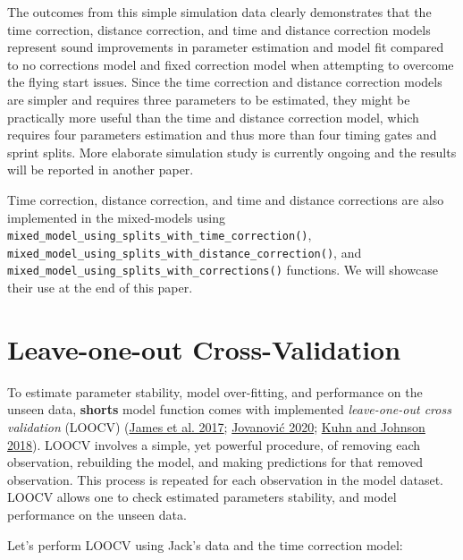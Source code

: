 \documentclass[fleqn,10pt]{wlpeerj} %
\newenvironment{Shaded}{\begin{snugshade}}{\end{snugshade}}
\newcommand{\AttributeTok}[1]{\textcolor[rgb]{0.77,0.63,0.00}{#1}}
\newcommand{\ConstantTok}[1]{\textcolor[rgb]{0.00,0.00,0.00}{#1}}
\newcommand{\FunctionTok}[1]{\textcolor[rgb]{0.00,0.00,0.00}{#1}}
\newcommand{\NormalTok}[1]{#1}
\newcommand{\OtherTok}[1]{\textcolor[rgb]{0.56,0.35,0.01}{#1}}
\newcommand{\SpecialCharTok}[1]{\textcolor[rgb]{0.00,0.00,0.00}{#1}}
\begin{document}
\normalsize

The outcomes from this simple simulation data clearly demonstrates that the time correction, distance correction, and time and distance correction models represent sound improvements in parameter estimation and model fit compared to no corrections model and fixed correction model when attempting to overcome the flying start issues. Since the time correction and distance correction models are simpler and requires three parameters to be estimated, they might be practically more useful than the time and distance correction model, which requires four parameters estimation and thus more than four timing gates and sprint splits. More elaborate simulation study is currently ongoing and the results will be reported in another paper.

Time correction, distance correction, and time and distance corrections are also implemented in the mixed-models using \texttt{mixed\_model\_using\_splits\_with\_time\_correction()}, \texttt{mixed\_model\_using\_splits\_with\_distance\_correction()}, and \texttt{mixed\_model\_using\_splits\_with\_corrections()} functions. We will showcase their use at the end of this paper.

\hypertarget{leave-one-out-cross-validation}{%
\section{Leave-one-out Cross-Validation}\label{leave-one-out-cross-validation}}

To estimate parameter stability, model over-fitting, and performance on the unseen data, \textbf{shorts} model function comes with implemented \emph{leave-one-out cross validation} (LOOCV) (\protect\hyperlink{ref-jamesIntroductionStatisticalLearning2017}{James et al. 2017}; \protect\hyperlink{ref-jovanovicBmbstatsBootstrapMagnitudebased2020}{Jovanović 2020}; \protect\hyperlink{ref-kuhnAppliedPredictiveModeling2018}{Kuhn and Johnson 2018}). LOOCV involves a simple, yet powerful procedure, of removing each observation, rebuilding the model, and making predictions for that removed observation. This process is repeated for each observation in the model dataset. LOOCV allows one to check estimated parameters stability, and model performance on the unseen data.

Let's perform LOOCV using Jack's data and the time correction model:

\small

\begin{Shaded}
\end{Shaded}
\end{document}

